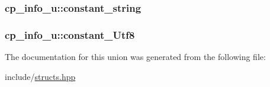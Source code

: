 \hypertarget{unioncp__info__u_acd87a20b30ed9024d98239c3cd14b0f9}{
\subsubsection[{constant\+\_\+string}]{ cp\+\_\+info\+\_\+u\+::constant\+\_\+string}}\label{unioncp__info__u_acd87a20b30ed9024d98239c3cd14b0f9}
\hypertarget{unioncp__info__u_a0a674b77186bea6da5c1f1311ba1b594}{
\subsubsection[{constant\+\_\+\+Utf8}]{ cp\+\_\+info\+\_\+u\+::constant\+\_\+\+Utf8}}\label{unioncp__info__u_a0a674b77186bea6da5c1f1311ba1b594}


The documentation for this union was generated from the following file\+:\begin{DoxyCompactItemize}
\item 
include/\hyperlink{structs_8hpp}{structs.\+hpp}\end{DoxyCompactItemize}
